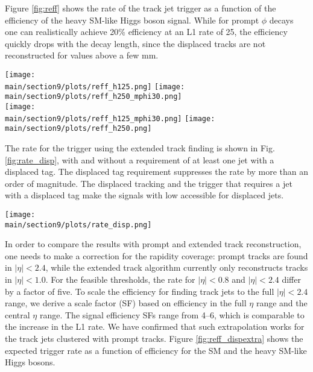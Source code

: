 Figure \ref{fig:reff} shows the rate of the track jet \HT trigger as a function of the efficiency
of the heavy SM-like Higgs boson signal. While for prompt $\phi$ decays one can realistically achieve 20\%
efficiency at an L1 rate of 25\UkHz, the efficiency quickly drops with the decay length, since the displaced tracks are not reconstructed for \dtrans values above a few mm.

\begin{figure*}[hbtp]\centering

 \texttt{[image: \\main/section9/plots/reff\_h125.png]}
 \texttt{[image: \\main/section9/plots/reff\_h250\_mphi30.png]} \\
 \texttt{[image: \\main/section9/plots/reff\_h125\_mphi30.png]}
\texttt{[image: \\main/section9/plots/reff\_h250.png]}
 \caption{The rate of the track jet \HT trigger as a function of signal efficiency for the SM Higgs boson (left) and the heavy SM-like Higgs boson (right) using prompt track finding.}
  \label{fig:reff}
\end{figure*}%

The rate for the \HT trigger using the extended track finding is shown in Fig. \ref{fig:rate_disp}, with and without 
a requirement of at least one jet with a displaced tag. The displaced tag requirement suppresses the rate by more than
an order of magnitude. The displaced tracking and the trigger that requires a jet with a displaced tag make the signals with low \HT accessible for displaced jets.

\begin{figure*}[hbtp]\centering
 \texttt{[image: \\main/section9/plots/rate\_disp.png]}
 \caption{The rate of the track jet \HT trigger using extended track finding with (solid line) and without (dashed line) a
 requirement of at least one jet with a displaced tag.}
  \label{fig:rate_disp}
\end{figure*}

In order to compare the results with prompt and extended track reconstruction, one needs to make a correction for
the rapidity coverage: prompt tracks are found in $|\eta|<2.4$, while the extended track algorithm currently only
reconstructs tracks in $|\eta|<1.0$.  For the feasible thresholds, the rate for $|\eta|<0.8$ and $|\eta|<2.4$ differ by a factor of five.  To scale the efficiency for finding track jets to the full
$|\eta|<2.4$ range, we derive a scale factor (SF) based on efficiency in the full $\eta$ range and the central $\eta$ range. The signal efficiency SFs range from 4--6, 
which is comparable to the increase in the L1 rate.
We have confirmed that such extrapolation works for the track jets clustered with prompt tracks. Figure \ref{fig:reff_dispextra} shows the expected trigger rate as a function of efficiency for the SM and the heavy SM-like Higgs bosons.

